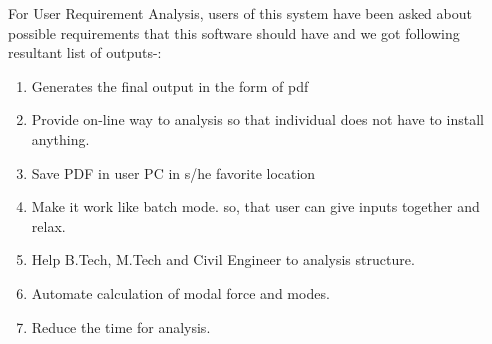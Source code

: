 For User Requirement Analysis, users of this system have been asked about 
possible requirements that this software should have and we got following
resultant list of outputs-:
\begin{enumerate}
\item Generates the final output in the form of pdf
\item Provide on-line way to analysis so that individual does not have to 
install anything.
\item Save PDF in user PC in s/he favorite location
\item Make it work like batch mode. so, that user can give inputs 
together and relax.
\item Help B.Tech, M.Tech and Civil Engineer to analysis structure.
\item Automate calculation of modal force and modes.
\item Reduce the time for analysis.
\end{enumerate}
